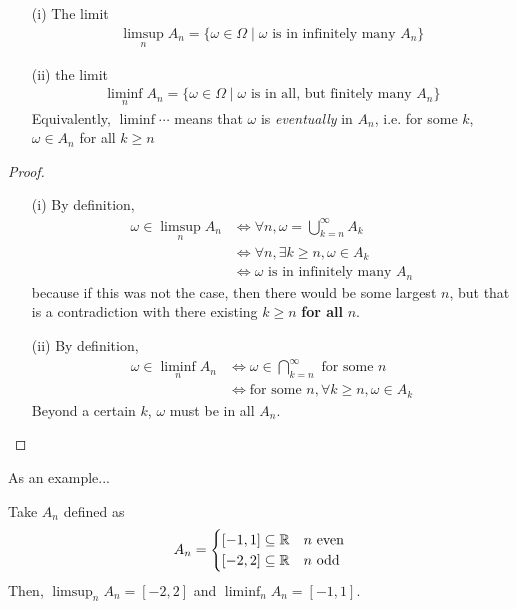 \begin{proposition}
    \begin{enumerate}
        \item[(i)] The limit
        \begin{align}
            \limsup_n A_n = \{ \omega \in \Omega \mid \omega \text{ is in infinitely many } A_n \}
        \end{align}
        \item[(ii)] the limit
        \begin{align}
            \liminf_n A_n = \{ \omega \in \Omega \mid \omega \text{ is in all, but finitely many } A_n \}
        \end{align}
        Equivalently, $\liminf \cdots$ means that $\omega$ is \textit{eventually} in $A_n$, i.e. for some $k$, $\omega \in A_n$ for all $k \ge n$
    \end{enumerate}
\end{proposition}
\begin{proof}
    \begin{enumerate}
        \item[(i)] By definition,
        \begin{align}
            \omega \in \limsup_n A_n
            &\iff \forall n, \omega = \bigcup_{k=n}^\infty A_k\\
            &\iff \forall n, \exists k \ge n, \omega \in A_k\\
            &\iff \omega \text{ is in infinitely many } A_n
        \end{align}
        because if this was not the case, then there would be some largest $n$, but that is a contradiction with there existing $k \ge n$ \textbf{for all} $n$.

        \item[(ii)] By definition,
        \begin{align}
            \omega \in \liminf_n A_n
            &\iff \omega \in \bigcap_{k=n}^\infty \text{ for some } n\\
            &\iff \text{for some } n, \forall k \ge n, \omega \in A_k
        \end{align}
        Beyond a certain $k$, $\omega$ must be in all $A_n$.
    \end{enumerate}
\end{proof}

As an example...
\begin{example}
    Take $A_n$ defined as
    \begin{align}
        A_n = \begin{cases}
            [-1,1] \subseteq \mathbb{R} & n \text{ even}\\
            [-2,2] \subseteq \mathbb{R} & n \text{ odd}
        \end{cases}
    \end{align}
    Then, $\limsup_n A_n = [-2,2]$ and $\liminf_n A_n = [-1,1]$.
\end{example}

